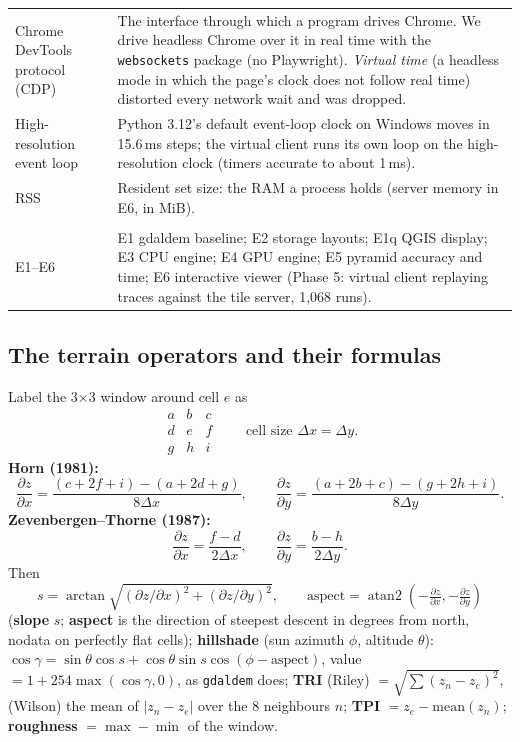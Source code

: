 ﻿\documentclass[11pt,a4paper]{article}
\newcommand{\code}[1]{\texttt{#1}}
\begin{document}
\begin{longtable}{>{\raggedright\arraybackslash}p{3.4cm}>{\raggedright\arraybackslash}p{12.0cm}}
Chrome DevTools protocol (CDP) & The interface through which a program drives Chrome. We drive headless Chrome over it
in real time with the \code{websockets} package (no Playwright). \emph{Virtual time} (a headless mode in which the page's
clock does not follow real time) distorted every network wait and was dropped. \\
High-resolution event loop & Python 3.12's default event-loop clock on Windows moves in 15.6\,ms steps; the virtual
client runs its own loop on the high-resolution clock (timers accurate to about 1\,ms). \\
RSS & Resident set size: the RAM a process holds (server memory in E6, in MiB). \\
\midrule
\multicolumn{2}{l}{\textit{Experiments}} \\
E1--E6 & E1 gdaldem baseline; E2 storage layouts; E1q QGIS display; E3 CPU engine; E4 GPU engine; E5 pyramid accuracy
and time; E6 interactive viewer (Phase 5: virtual client replaying traces against the tile server, 1{,}068 runs). \\
\bottomrule
\end{longtable}

\subsection{The terrain operators and their formulas}\label{sec:formulas}
Label the 3$\times$3 window around cell $e$ as
\[
\begin{array}{ccc} a & b & c\\ d & e & f\\ g & h & i \end{array}
\qquad \text{cell size } \Delta x = \Delta y .
\]
\textbf{Horn (1981):}
\[ \frac{\partial z}{\partial x} = \frac{(c+2f+i)-(a+2d+g)}{8\Delta x},\qquad
\frac{\partial z}{\partial y} = \frac{(a+2b+c)-(g+2h+i)}{8\Delta y}. \]
\textbf{Zevenbergen--Thorne (1987):}
\[ \frac{\partial z}{\partial x} = \frac{f-d}{2\Delta x},\qquad \frac{\partial z}{\partial y} = \frac{b-h}{2\Delta y}. \]
Then
\[ s = \arctan\sqrt{(\partial z/\partial x)^2 + (\partial z/\partial y)^2}, \qquad
\text{aspect} = \operatorname{atan2}\!\left(-\tfrac{\partial z}{\partial x}, -\tfrac{\partial z}{\partial y}\right) \]
(\textbf{slope} $s$; \textbf{aspect} is the direction of steepest descent in degrees from north, nodata on perfectly flat
cells); \textbf{hillshade} (sun azimuth $\phi$, altitude $\theta$):
$\cos\gamma = \sin\theta\cos s + \cos\theta\sin s\cos(\phi - \text{aspect})$, value $= 1 + 254\max(\cos\gamma, 0)$, as
\code{gdaldem} does; \textbf{TRI} (Riley) $= \sqrt{\sum (z_n - z_e)^2}$, (Wilson) the mean of $|z_n - z_e|$ over the 8
neighbours $n$; \textbf{TPI} $= z_e - \text{mean}(z_n)$; \textbf{roughness} $= \max - \min$ of the window.
\end{document}
